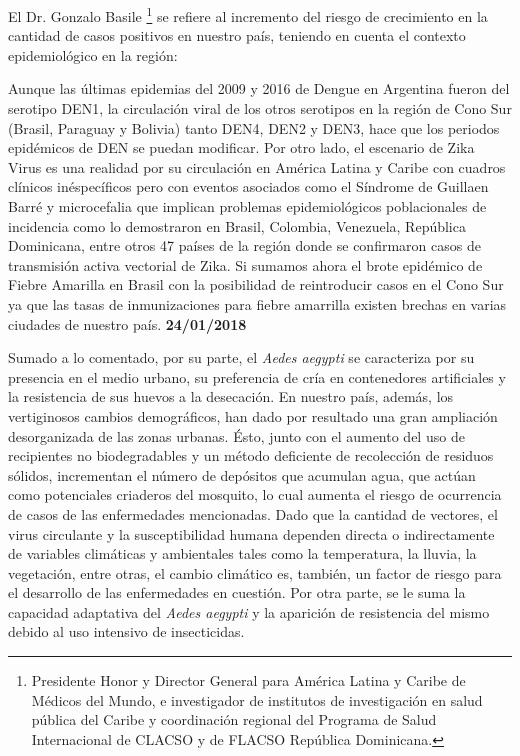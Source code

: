   \par El Dr. Gonzalo Basile \footnote{Presidente Honor y Director General para
                   América Latina y Caribe de Médicos del Mundo, e investigador de institutos de
                   investigación en salud pública del Caribe y coordinación regional del Programa
                   de Salud Internacional de CLACSO y de FLACSO República Dominicana.}
       se refiere al incremento del riesgo de crecimiento
       en la cantidad de casos positivos en nuestro país, teniendo en cuenta
       el contexto epidemiológico en la región:
    \begin{framed}

      Aunque las últimas epidemias del 2009 y 2016 de Dengue en Argentina fueron del
      serotipo DEN1, la circulación viral de los otros serotipos en la región de
      Cono Sur (Brasil, Paraguay y Bolivia) tanto DEN4, DEN2 y DEN3, hace que los
      periodos epidémicos de DEN se puedan modificar. Por otro lado, el escenario de
      Zika Virus es una realidad por su circulación en América Latina y Caribe con
      cuadros clínicos inéspecíficos pero con eventos asociados como el Síndrome de
      Guillaen Barré y microcefalia que implican problemas epidemiológicos
      poblacionales de incidencia como lo demostraron en Brasil, Colombia, Venezuela,
      República Dominicana, entre otros 47 países de la región donde se confirmaron
      casos de transmisión activa vectorial de Zika.
      Si sumamos ahora el brote epidémico de Fiebre Amarilla en Brasil con la
      posibilidad de reintroducir casos en el Cono Sur ya que las tasas de
      inmunizaciones para fiebre amarrilla existen brechas en varias ciudades de nuestro país. \textbf{24/01/2018}
    \end{framed}



  \par Sumado a lo comentado, por su parte, el \textit{Aedes aegypti} se
    caracteriza por su presencia en el medio urbano, su preferencia
    de cría en contenedores artificiales \cite{cont_artificiales} y la
    resistencia de sus huevos a la
    desecación. En nuestro país, además, los vertiginosos cambios demográficos, han dado
    por resultado una gran ampliación desorganizada de las zonas urbanas. Ésto, junto
    con el aumento del uso de recipientes no biodegradables y un método deficiente
    de recolección de residuos sólidos, incrementan el número de depósitos que
    acumulan agua, que actúan como potenciales criaderos del mosquito, lo cual aumenta el
    riesgo de ocurrencia de casos de las enfermedades mencionadas.
    Dado que la cantidad de vectores, el virus circulante y la susceptibilidad
    humana dependen directa o indirectamente de variables climáticas y ambientales
    tales como la temperatura, la lluvia, la vegetación, entre otras,
    el cambio climático es, también, un factor de riesgo para el desarrollo
    de las enfermedades en cuestión. Por otra parte, se le suma la capacidad adaptativa del
    \textit{Aedes aegypti} y la aparición de resistencia del mismo debido al uso intensivo de
    insecticidas.


